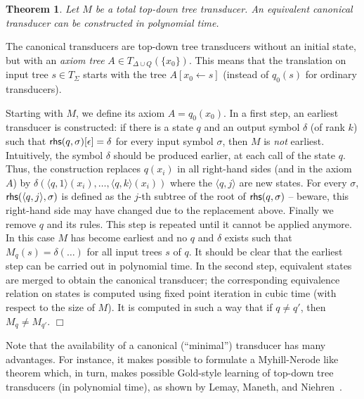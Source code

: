 \documentclass[copyright,creativecommons]{eptcs}
\newtheorem{theorem}{Theorem}
\newcommand{\eop}{\hspace*{\fill}$\Box$}
\newenvironment{proof}{{\it Proof.}\quad}{\eop\vspace*{4mm}}
\def\rhs{{\sf rhs}}
\begin{document}
\begin{theorem}\rm\label{theo:EMS}
Let $M$ be a total top-down tree transducer. An equivalent canonical 
transducer can be constructed in polynomial time. 
\end{theorem}
\begin{proof}
The canonical transducers are top-down tree transducers 
without an initial state, but with 
an \emph{axiom tree} $A\in T_{\Delta\cup Q}(\{x_0\})$. 
This means that the translation on input tree $s\in T_\Sigma$
starts with the tree $A[x_0\leftarrow s]$ 
(instead of $q_0(s)$ for ordinary transducers).

Starting with $M$, we define its axiom $A=q_0(x_0)$.
In a first step, an earliest transducer is constructed:
if there is a state $q$ and an output symbol $\delta$ (of rank $k$)
such that $\rhs(q,\sigma)[\epsilon]=\delta$ for every input symbol $\sigma$,
then $M$ is \emph{not} earliest. 
Intuitively, the symbol $\delta$ should be produced earlier, at
each call of the state $q$. Thus, the construction 
replaces $q(x_i)$ in all right-hand sides (and in the axiom $A$) by 
$\delta(\langle q,1\rangle(x_i),\dots,\langle q,k\rangle(x_i))$
where the $\langle q,j\rangle$ are new states.
For every $\sigma$, $\rhs(\langle q,j\rangle,\sigma)$ 
is defined as the $j$-th subtree of the root of 
$\rhs(q,\sigma)$ -- beware, this right-hand side may have
changed due to the replacement above. 
Finally we remove $q$ and its rules.
This step is repeated until it cannot be applied anymore. 
In this case $M$ has become earliest and 
no $q$ and $\delta$ exists such that
$M_q(s)=\delta(\dots)$ for all input trees $s$ of $q$. 
It should be clear that the earliest step can be carried
out in polynomial time.
In the second step, equivalent states are merged to obtain the canonical transducer;
the corresponding 
equivalence relation on states is computed using
fixed point iteration in cubic time (with respect to the size of $M$).
It is computed in such a way that if $q\not= q'$, then $M_q\not= M_{q'}$.
\end{proof}

Note that the availability of a canonical (``minimal'') transducer
has many advantages. For instance, it makes possible to formulate a
Myhill-Nerode like theorem which, in turn, makes possible Gold-style
learning of top-down tree transducers (in polynomial time),
as shown by Lemay, Maneth, and Niehren~\cite{DBLP:conf/pods/LemayMN10}.
\end{document}
